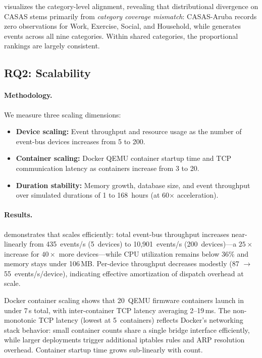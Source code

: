  visualizes the category-level alignment,
revealing that distributional divergence on CASAS stems primarily
from \emph{category coverage mismatch}: CASAS-Aruba records zero
observations for Work, Exercise, Social, and Household, while
\sys{} generates events across all nine categories.  Within shared
categories, the proportional rankings are largely consistent.

\subsection{RQ2: Scalability}\label{sec:eval-rq2}

\paragraph{Methodology.}
We measure three scaling dimensions:
\begin{itemize}[leftmargin=*]
  \item \textbf{Device scaling:} Event throughput and resource usage
    as the number of event-bus devices increases from 5 to 200.
  \item \textbf{Container scaling:} Docker QEMU container startup
    time and TCP communication latency as containers increase from
    3 to 20.
  \item \textbf{Duration stability:} Memory growth, database size,
    and event throughput over simulated durations of 1 to 168~hours
    (at 60$\times$ acceleration).
\end{itemize}

\paragraph{Results.}





 demonstrates that \sys{} scales efficiently:
total event-bus throughput increases near-linearly from 435~events/s
(5~devices) to 10{,}901~events/s (200~devices)---a $25\times$
increase for $40\times$ more devices---while CPU utilization
remains below 36\% and memory stays under 106\,MB.
Per-device throughput decreases modestly (87 $\to$ 55~events/s/device),
indicating effective amortization of dispatch overhead at scale.

Docker container scaling shows that 20~QEMU firmware containers
launch in under 7\,s total, with inter-container TCP latency
averaging 2--19\,ms.  The non-monotonic TCP latency (lowest at
5~containers) reflects Docker's networking stack behavior: small
container counts share a single bridge interface efficiently,
while larger deployments trigger additional iptables rules and
ARP resolution overhead.  Container startup time grows sub-linearly
with count.

